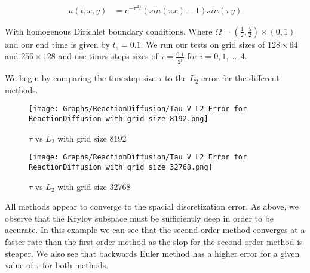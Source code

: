 \begin{align*}
    u(t, x, y) &= e^{-\pi^2t}(sin(\pi x) - 1)sin(\pi y)
\end{align*}

With homogenous Dirichlet boundary conditions.
Where $\Omega = (\frac12, \frac52)\times(0,1)$ and our end time is given by $t_e = 0.1$.
We run our tests on grid sizes of $128\times64$ and $256\times128$ and use times steps sizes of $\tau=\frac{0.1}{2^i}$ for $i = 0,1,...,4$.


We begin by comparing the timestep size $\tau$ to the $L_2$ error for the different methods.
\begin{figure}[H]
    \centering
    \begin{minipage}{0.49\textwidth}
        \texttt{[image: Graphs/ReactionDiffusion/Tau V L2 Error for ReactionDiffusion with grid size 8192.png]} %
        \caption{$\tau$ vs $L_2$ with grid size 8192}
        \label{fig:ACtauE}
    \end{minipage}\hfill
    \centering
    \begin{minipage}{0.49\textwidth}
        \texttt{[image: Graphs/ReactionDiffusion/Tau V L2 Error for ReactionDiffusion with grid size 32768.png]} %
        \caption{$\tau$ vs $L_2$ with grid size 32768}
        \label{fig:ACtauE1024}
    \end{minipage}\hfill
\end{figure}
All methods appear to converge to the spacial discretization error.
As above, we observe that the Krylov subspace must be sufficiently deep in order to be accurate.
In this example we can see that the second order method converges at a faster rate than the first order method as the slop for the second order method is steaper.
We also see that backwards Euler method has a higher error for a given value of $\tau$ for both methods.

